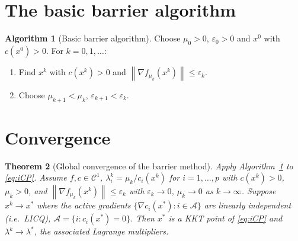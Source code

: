 \documentclass[11pt,a4paper]{report}
\theoremstyle{plain}
\newtheorem{theorem}{Theorem}[chapter]
\theoremstyle{definition}
\newtheorem{algorithm}[theorem]{Algorithm}
\newcommand{\norm}[1]{\left\lVert#1\right\rVert}
\newcommand{\grad}{\nabla}
\newcommand{\eps}{\varepsilon}
\begin{document}
\section{The basic barrier algorithm}

\begin{algorithm}[Basic barrier algorithm]\label{alg:barrier}
Choose $\mu_{0}>0$, $\eps_{0}>0$ and $x^{0}$ with $c(x^{0})>0$.
For $k=0,1,\dots$:
\begin{enumerate}[leftmargin=2em,itemsep=0pt]
  \item Find $x^{k}$ with $c(x^{k})>0$ and $\norm{\grad f_{\mu_{k}}(x^{k})}\le\eps_{k}$.
  \item Choose $\mu_{k+1}<\mu_{k}$, $\eps_{k+1}<\eps_{k}$.
\end{enumerate}
\end{algorithm}

\section{Convergence}

\begin{theorem}[Global convergence of the barrier method]\label{thm:barrier}
Apply Algorithm~\ref{alg:barrier} to \eqref{eq:iCP}. Assume $f,c\in\mathcal{C}^{1}$,
$\lambda^{k}_{i}=\mu_{k}/c_{i}(x^{k})$ for $i=1,\dots,p$ with $c(x^{k})>0$,
$\mu_{k}>0$, and
$\norm{\grad f_{\mu_{k}}(x^{k})}\le\eps_{k}$ with $\eps_{k}\to 0$, $\mu_{k}\to 0$
as $k\to\infty$. Suppose $x^{k}\to x^{*}$ where the active gradients
$\{\grad c_{i}(x^{*}):i\in\mathcal{A}\}$ are linearly independent (i.e.\ LICQ),
$\mathcal{A}=\{i:c_{i}(x^{*})=0\}$. Then $x^{*}$ is a KKT point of
\eqref{eq:iCP} and $\lambda^{k}\to\lambda^{*}$, the associated Lagrange multipliers.
\end{theorem}
\end{document}

